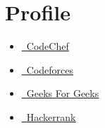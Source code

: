 \documentclass[letterpaper,11pt]{article}
\newcommand{\resumeItem}[1]{
  \item\small{
    {#1 \vspace{-2pt}}
  }
}
\newcommand{\resumeItemListStart}{\begin{itemize}}
\newcommand{\resumeItemListEnd}{\end{itemize}\vspace{-5pt}}
\begin{document}
 \section{Profile}
 \resumeItemListStart
    \resumeItem{\href{https://www.codechef.com/users/sam_cmd}{\raisebox{-0.2\height}\  \underline{CodeChef}}}
    \resumeItem{\href{https://codeforces.com/profile/sam_cmd_}{\raisebox{-0.2\height}\  \underline{Codeforces}}}
    \resumeItem{\href{https://auth.geeksforgeeks.org/user/yuggurnani091/practice/}{\raisebox{-0.2\height}\  \underline{Geeks For Geeks}}}
    \resumeItem{\href{https://www.hackerrank.com/yug_gurnani091?hr_r=1}{\raisebox{-0.2\height}\  \underline{Hackerrank}}}
\resumeItemListEnd
\end{document}
